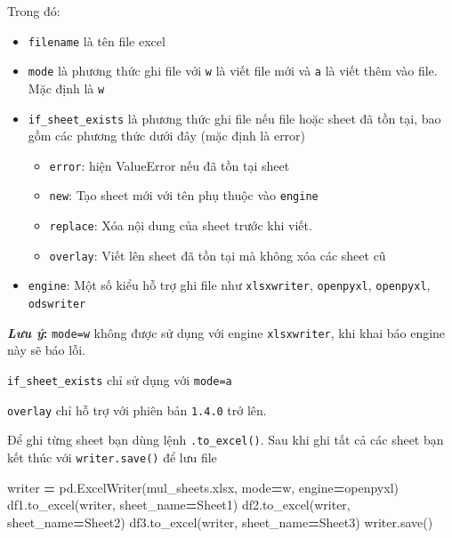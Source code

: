 \documentclass[
]{book}
\makeatletter
\newenvironment{Shaded}{\begin{snugshade}}{\end{snugshade}}
\newcommand{\NormalTok}[1]{#1}
\newcommand{\OperatorTok}[1]{\textcolor[rgb]{0.81,0.36,0.00}{\textbf{#1}}}
\newcommand{\StringTok}[1]{\textcolor[rgb]{0.31,0.60,0.02}{#1}}
\newenvironment{kframe}{%
\medskip{}
\setlength{\fboxsep}{.8em}
 \def\at@end@of@kframe{}%
 \ifinner\ifhmode%
  \def\at@end@of@kframe{\end{minipage}}%
  \begin{minipage}{\columnwidth}%
 \fi\fi%
 \def\FrameCommand##1{\hskip\@totalleftmargin \hskip-\fboxsep
 \colorbox{shadecolor}{##1}\hskip-\fboxsep
     \hskip-\linewidth \hskip-\@totalleftmargin \hskip\columnwidth}%
 \MakeFramed {\advance\hsize-\width
   \@totalleftmargin\z@ \linewidth\hsize
   \@setminipage}}%
 {\par\unskip\endMakeFramed%
 \at@end@of@kframe}
\newenvironment{rmdblock}[1]
  {
  \begin{itemize}
  \renewcommand{\labelitemi}{
    \raisebox{-.7\height}[0pt][0pt]{
      {\setkeys{Gin}{width=3em,keepaspectratio}\texttt{[image: images/\#1]}}
    }
  }
  \setlength{\fboxsep}{1em}
  \begin{kframe}
  \item
  }
  {
  \end{kframe}
  \end{itemize}
  }
\newenvironment{rmdnote}
  {\begin{rmdblock}{note}}
  {\end{rmdblock}}
\makeatother
\begin{document}
Trong đó:

\begin{itemize}
\item
  \texttt{filename} là tên file excel
\item
  \texttt{mode} là phương thức ghi file với \texttt{w} là viết file mới và \texttt{a} là viết thêm vào file. Mặc định là \texttt{w}
\item
  \texttt{if\_sheet\_exists} là phương thức ghi file nếu file hoặc sheet đã tồn tại, bao gồm các phương thức dưới đây (mặc định là error)

  \begin{itemize}
  \item
    \texttt{error}: hiện ValueError nếu đã tồn tại sheet
  \item
    \texttt{new}: Tạo sheet mới với tên phụ thuộc vào \texttt{engine}
  \item
    \texttt{replace}: Xóa nội dung của sheet trước khi viết.
  \item
    \texttt{overlay}: Viết lên sheet đã tồn tại mà không xóa các sheet cũ
  \end{itemize}
\item
  \texttt{engine}: Một số kiểu hỗ trợ ghi file như \texttt{xlsxwriter}, \texttt{openpyxl}, \texttt{openpyxl}, \texttt{odswriter}
\end{itemize}

\begin{rmdnote}
\textbf{\emph{Lưu ý}:}
\texttt{mode=\textquotesingle{}w\textquotesingle{}} không được sử dụng với engine \texttt{xlsxwriter}, khi khai báo engine này sẽ báo lỗi.

\texttt{if\_sheet\_exists} chỉ sử dụng với \texttt{mode=\textquotesingle{}a\textquotesingle{}}

\texttt{overlay} chỉ hỗ trợ với phiên bản \texttt{1.4.0} trở lên.
\end{rmdnote}

Để ghi từng sheet bạn dùng lệnh \texttt{.to\_excel()}. Sau khi ghi tất cả các sheet bạn kết thúc với \texttt{writer.save()} để lưu file

\begin{Shaded}
\begin{Highlighting}[]
\NormalTok{writer }\OperatorTok{=}\NormalTok{ pd.ExcelWriter(}\StringTok{\textquotesingle{}mul\_sheets.xlsx\textquotesingle{}}\NormalTok{, mode}\OperatorTok{=}\StringTok{\textquotesingle{}w\textquotesingle{}}\NormalTok{, engine}\OperatorTok{=}\StringTok{\textquotesingle{}openpyxl\textquotesingle{}}\NormalTok{)}
\NormalTok{df1.to\_excel(writer, sheet\_name}\OperatorTok{=}\StringTok{\textquotesingle{}Sheet1\textquotesingle{}}\NormalTok{)}
\NormalTok{df2.to\_excel(writer, sheet\_name}\OperatorTok{=}\StringTok{\textquotesingle{}Sheet2\textquotesingle{}}\NormalTok{)}
\NormalTok{df3.to\_excel(writer, sheet\_name}\OperatorTok{=}\StringTok{\textquotesingle{}Sheet3\textquotesingle{}}\NormalTok{)}
\NormalTok{writer.save()}
\end{Highlighting}
\end{Shaded}
\end{document}
